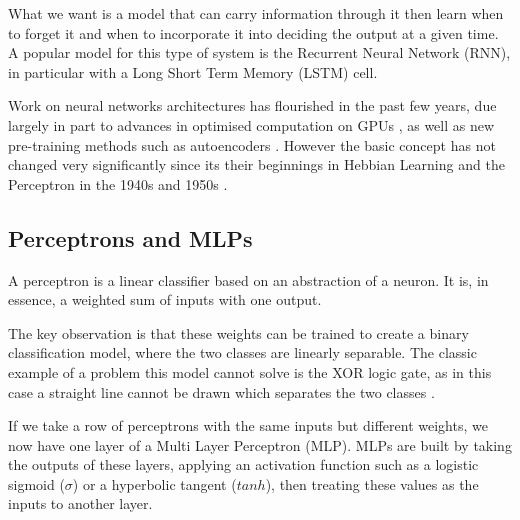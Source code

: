 \documentclass[bsc,singlespacing,logo, parskip, deptreport]{infthesis}
\begin{document}
What we want is a model that can carry information through it then learn when to forget it and when to incorporate it into deciding the output at a given time. A popular model for this type of system is the Recurrent Neural Network (RNN), in particular with a Long Short Term Memory (LSTM) cell.

Work on neural networks architectures has flourished in the past few years, due largely in part to advances in optimised computation on GPUs \cite{oh2004gpu}\cite{krizhevsky2012imagenet}, as well as new pre-training methods such as autoencoders \cite{hinton2006reducing}\cite{vincent2008extracting}\cite{deng2010binary}. However the basic concept has not changed very significantly since its their beginnings in Hebbian Learning and the Perceptron in the 1940s and 1950s \cite{hebb1949first} \cite{rosenblatt1958perceptron}.

\subsection{Perceptrons and MLPs}

A perceptron is a linear classifier based on an abstraction of a neuron. It is, in essence, a weighted sum of inputs with one output.

\begin{center}
\end{center}

The key observation is that these weights can be trained to create a binary classification model, where the two classes are linearly separable. The classic example of a problem this model cannot solve is the XOR logic gate, as in this case a straight line cannot be drawn which separates the two classes \cite{minsky1969perceptrons}.

If we take a row of perceptrons with the same inputs but different weights, we now have one layer of a Multi Layer Perceptron (MLP). MLPs are built by taking the outputs of these layers, applying an activation function such as a logistic sigmoid ($\sigma$) or a hyperbolic tangent ($tanh$), then treating these values as the inputs to another layer.
\end{document}
